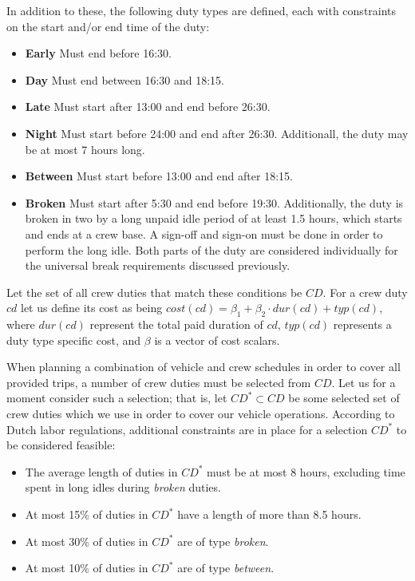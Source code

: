 \documentclass[]{article}
\begin{document}
In addition to these, the following duty types are defined, each with constraints on the start and/or end time of the duty:
\begin{itemize}
  \item \textbf{Early} Must end before 16:30.
  \item \textbf{Day} Must end between 16:30 and 18:15.
  \item \textbf{Late} Must start after 13:00 and end before 26:30.
  \item \textbf{Night} Must start before 24:00 and end after 26:30. Additionall, the duty may be at most 7 hours long.
  \item \textbf{Between} Must start before 13:00 and end after 18:15.
  \item \textbf{Broken} Must start after 5:30 and end before 19:30. Additionally, the duty is broken in two by a long unpaid idle period of at least 1.5 hours, which starts and ends at a crew base. A sign-off and sign-on must be done in order to perform the long idle. Both parts of the duty are considered individually for the universal break requirements discussed previously.
\end{itemize}
Let the set of all crew duties that match these conditions be $CD$. For a crew duty $cd$ let us define its cost as being $cost(cd) = \beta_1 + \beta_2 \cdot dur(cd) + typ(cd)$, where $dur(cd)$ represent the total paid duration of $cd$, $typ(cd)$ represents a duty type specific cost, and $\beta$ is a vector of cost scalars. \newline

\noindent When planning a combination of vehicle and crew schedules in order to cover all provided trips, a number of crew duties must be selected from $CD$. Let us for a moment consider such a selection; that is, let $CD^* \subset CD$ be some selected set of crew duties which we use in order to cover our vehicle operations. According to Dutch labor regulations, additional constraints are in place for a selection $CD^*$ to be considered feasible: 
\begin{itemize}
  \item The average length of duties in $CD^*$ must be at most 8 hours, excluding time spent in long idles during \textit{broken} duties.
  \item At most 15\% of duties in $CD^*$ have a length of more than 8.5 hours.
  \item At most 30\% of duties in $CD^*$ are of type \textit{broken}.
  \item At most 10\% of duties in $CD^*$ are of type \textit{between}.
\end{itemize} 
\end{document}
